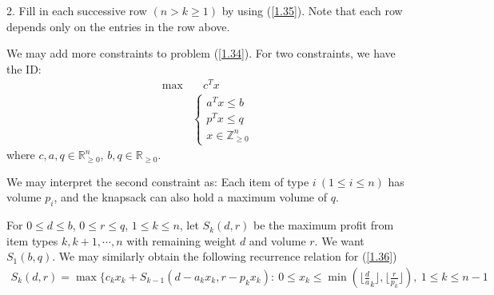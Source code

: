 2. Fill in each successive row $(n>k\geqslant 1)$ by using (\ref{1.35}). Note that each row depends only on the entries in the row above.

We may add more constraints to problem (\ref{1.34}). For two constraints, we have the ID:
\begin{align}
    \max &\quad c^T x \nonumber\\
    &\left\lbrace\begin{array}{l}
        a^Tx\leqslant b \\
        p^Tx\leqslant q\\
        x\in \mathbb{Z}^n_{\geqslant 0}
    \end{array} \right.\label{1.36}
\end{align}
where $c, a, q\in\mathbb{R}^n_{\geqslant 0}$, $b, q\in\mathbb{R}_{\geqslant 0}$.

We may interpret the second constraint as: Each item of type $i\ (1\leqslant i\leqslant n)$ has volume $p_i$, and the knapsack can also hold a maximum volume of $q$.

For $0\leqslant d\leqslant b$, $0\leqslant r\leqslant q$, $1\leqslant k\leqslant n$, let $S_k(d, r)$ be the maximum profit from item types $k, k+1, \cdots, n$ with remaining weight $d$ and volume $r$. We want $S_1(b, q)$. We may similarly obtain the following recurrence relation for (\ref{1.36})
\begin{align}
    S_k(d, r) = \max\{c_kx_k + S_{k-1}(d-a_kx_k, r-p_kx_k):\ 0\leqslant x_k\leqslant \min\left( \lfloor\frac{d}{a}_k\rfloor, \lfloor\frac{r}{p_k}\rfloor\right), \ 1\leqslant k\leqslant n-1\label{1.37}
\end{align}

